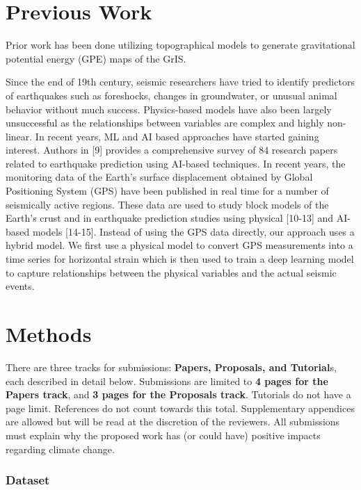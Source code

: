 \documentclass{article}
\begin{document}
\section{Previous Work}

Prior work has been done utilizing topographical models to generate gravitational potential energy (GPE) maps of the GrIS. 

Since the end of 19th century, seismic researchers have tried to identify predictors of earthquakes such as foreshocks, changes in groundwater, or unusual animal behavior without much success. Physics-based models have also been largely unsuccessful as the relationships between variables are complex and highly non-linear. In recent years, ML and AI based approaches have started gaining interest. Authors in [9] provides a comprehensive survey of 84 research papers related to earthquake prediction using AI-based techniques. In recent years, the monitoring data of the Earth’s surface displacement obtained by Global Positioning System (GPS) have been published in real time for a number of seismically active regions. These data are used to study block models of the Earth’s crust and in earthquake prediction studies using physical [10-13] and AI-based models [14-15]. Instead of using the GPS data directly, our approach uses a hybrid model. We first use a physical model to convert GPS measurements into a time series for horizontal strain which is then used to train a deep learning model to capture relationships between the physical variables and the actual seismic events. 

\section{Methods}

There are three tracks for submissions: \textbf{Papers, Proposals, and Tutorial}s, each described in detail below.  Submissions are limited to \textbf{4 pages for the Papers track}, and \textbf{3 pages for the Proposals track}. Tutorials do not have a page limit. References do not count towards this total. Supplementary appendices are allowed but will be read at the discretion of the reviewers. All submissions must explain why the proposed work has (or could have) positive impacts regarding climate change.

\subsubsection{Dataset}
\end{document}
